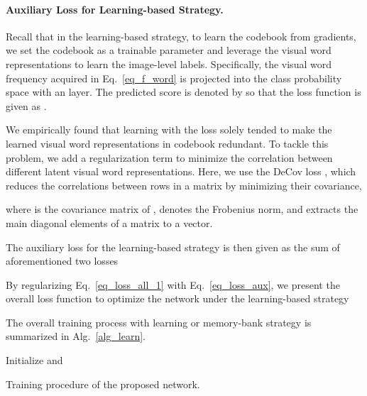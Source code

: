 \paragraph{\textbf{Auxiliary Loss for Learning-based Strategy.}} Recall that in the learning-based strategy, to learn the codebook from gradients, we set the codebook as a trainable parameter and leverage the visual word representations to learn the image-level labels. Specifically, the visual word frequency  acquired in Eq.~\eqref{eq_f_word} is projected into the class probability space with an  layer. The predicted score is denoted by  so that the loss function is given as .
\par We empirically found that learning with the loss  solely tended to make the learned visual word representations in codebook  redundant. To tackle this problem, we add a regularization term to minimize the correlation between different latent visual word representations. Here, we use the DeCov loss \citep{cogswell2015reducing}, which reduces the correlations between rows in a matrix by minimizing their covariance, \ie

where  is the covariance matrix of ,  denotes the Frobenius norm, and  extracts the main diagonal elements of a matrix to a vector.
\par The auxiliary loss for the learning-based strategy is then given as the sum of aforementioned two losses

\par By regularizing Eq.~\eqref{eq_loss_all_1} with Eq.~\eqref{eq_loss_aux}, we present the overall loss function to optimize the network under the learning-based strategy

\par The overall training process with learning or memory-bank strategy is summarized in Alg.~\ref{alg_learn}.

\begin{algorithm}
  \SetAlgoLined
  Initialize  and \;
  \caption{Training procedure of the proposed network.}
  \label{alg_learn}
\end{algorithm}

